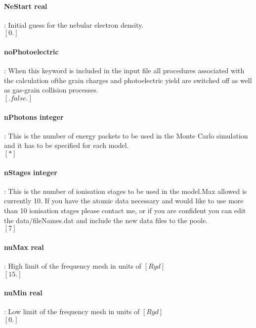 \documentclass[11pt]{article}
\begin{document}
\paragraph   { NeStart real   }  : Initial guess for the nebular electron density. \\
		     $[0.]$\\

\paragraph {noPhotoelectric} : When this keyword is included in the input file all procedures associated with the calculation ofthe grain charges and photoelectric yield are switched off as well as gas-grain collision processes. \\
$[.false.]$\\

\paragraph   { nPhotons integer}: This is the number of energy packets to be used in the Monte 
		     Carlo simulation and it has to be specified for each model.\\
		     $[*]$ \\

\paragraph   { nStages integer}: This is the number of ionisation stages to be used in the model.Max allowed is currently 10. If you have the atomic data necessary and would like to use more than 10 ionisation stages please contact me, or if you are confident you can edit the data/fileNames.dat and include the new data files to the poole. \\
		     $[7]$ \\

\paragraph   { nuMax real  }    : High limit of the frequency mesh in units of $[Ryd]$\\
		     $[15.]$\\

\paragraph   { nuMin real }     : Low limit of the frequency mesh in units of $[Ryd]$\\
		     $[0.]$\\
\end{document}
